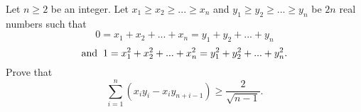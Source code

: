 Let $n \ge 2$ be an integer. Let $x_1 \ge x_2 \ge ... \ge x_n$ and $y_1 \ge y_2 \ge ... \ge y_n$ be $2n$ real numbers such that $$0 = x_1 + x_2 + ... + x_n = y_1 + y_2 + ... + y_n $$$$\text{and} \hspace{2mm} 1 =x_1^2 + x_2^2 + ... + x_n^2 = y_1^2 + y_2^2 + ... + y_n^2.$$Prove that $$\sum_{i = 1}^n (x_iy_i - x_iy_{n + i - 1}) \ge \frac{2}{\sqrt{n-1}}.$$